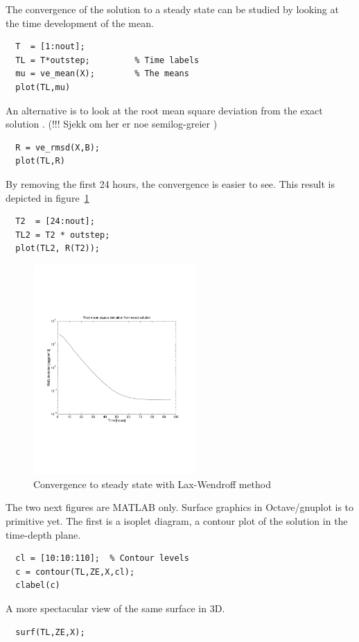 The convergence of the solution to a steady state can be studied by
looking at the time development of the mean.
\begin{verbatim}
  T  = [1:nout];
  TL = T*outstep;         % Time labels 
  mu = ve_mean(X);        % The means 
  plot(TL,mu) 
\end{verbatim}
An alternative is to look at the root mean square deviation
from the exact solution .
(!!! Sjekk om her er noe semilog-greier )
\begin{verbatim}
  R = ve_rmsd(X,B);
  plot(TL,R)
\end{verbatim}
By removing the first 24 hours, the convergence is easier to see.
This result is depicted in figure~\ref{fig:ex2}
\begin{verbatim}
  T2  = [24:nout];
  TL2 = T2 * outstep;
  plot(TL2, R(T2));
\end{verbatim}
  
\begin{figure}
\begin{center}
\includegraphics[height=8cm]{ex2}
\end{center}
\caption{Convergence to steady state with Lax-Wendroff method}\label{fig:ex2}
\end{figure}

The two next figures are MATLAB only. Surface graphics in
Octave/gnuplot is to primitive yet. The first is a isoplet
diagram, a contour plot of the solution in the time-depth plane.
\begin{verbatim}
  cl = [10:10:110];  % Contour levels 
  c = contour(TL,ZE,X,cl); 
  clabel(c) 
\end{verbatim}
A more spectacular view of the same surface in 3D.
\begin{verbatim}
  surf(TL,ZE,X); 
\end{verbatim}

